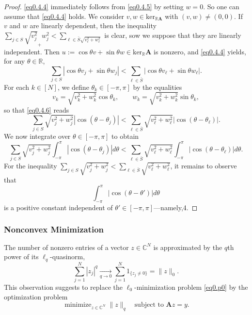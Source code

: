 \begin{proof}
    \cref{eq0.4.4} immediately follows from \cref{eq0.4.5} by setting $w = 0$. So one can assume that \cref{eq0.4.4} holds. We consider $v,w \in \text{ker}_{\mathbb{R}\mathbf{A}}$ with $(v,w) \neq (0,0)$. If $v$ and $w$ are linearly dependent, then the inequality $\sum_{j \in S} \sqrt{v_j^2} _+ w_j^2 < \sum_{\ell \in \bar{S} \sqrt{v_{\ell}^2 + w_{\ell}^2}}$ is clear, sow we suppose that they are linearly independent. Then $u := \cos\theta v + \sin \theta w \in \text{ker}_{\mathbb{R}}\mathbf{A}$ is nonzero, and \cref{eq0.4.4} yields, for any $\theta \in \mathbb{R}$, 
    \begin{equation}
        \sum\limits_{j \in S} \left|\cos \theta v_j + \sin \theta w_j\right| < \sum\limits_{\ell \in \bar{S}} \left|\cos \theta v_{\ell} + \sin \theta w_{\ell}\right|.
        \label{eq0.4.6}
    \end{equation}
    For each $k \in [N]$, we define $\theta_k \in [-\pi, \pi]$ by the equalities
    \[
        v_k = \sqrt{v_k^2 + w_k^2} \cos \theta_k, \qquad w_k = \sqrt{v_k^2 + w_k^2} \sin \theta_k,
    \]
    so that \cref{eq0.4.6} reads
    \[
        \sum\limits_{j \in S} \sqrt{v_j^2 + w_j^2}\left|\cos (\theta - \theta_j)\right| < \sum\limits_{\ell \in \bar{S}} \sqrt{v_{\ell}^2 + w_{\ell}^2} \left|\cos(\theta - \theta_{\ell})\right|.
    \]
    We now integrate over $\theta \in [-\pi, \pi]$ to obtain
    \[
        \sum\limits_{j \in S} \sqrt{v_j^2 + w_j^2} \int_{-\pi}^{\pi} \left|\cos(\theta - \theta_j)\right|d\theta < \sum\limits_{\ell \in \bar{S}} \sqrt{v_{\ell}^2 + w_{\ell}^2} \int_{-\pi}^{\pi}\left|\cos(\theta - \theta_{\ell})\right|d\theta.
    \]
    For the inequality $\sum_{j \in S} \sqrt{v_j^2+w_j^2} < \sum_{\ell \in \bar{S}} \sqrt{v_{\ell}^2+ w_{\ell}^2}$, it remains to observe that 
    \[
        \int_{-\pi}^{\pi}\left|\cos(\theta - \theta')\right|d\theta
    \]
    is a positive constant independent of $\theta'\in [-\pi, \pi]$---namely,4. 
\end{proof}

\subsubsection{Nonconvex Minimization}

The number of nonzero entries of a vector $z \in \mathbb{C}^N$ is approximated by the $q$th power of its $\ell_q$-quasinorm,
\[
    \sum\limits_{j = 1}^N \left|z_j\right|^q \xrightarrow[q \rightarrow 0]{} \sum\limits_{j=1}^N 1_{\{z_j \neq 0\}} = \|z\|_0. 
\]
This observation suggests to replace the $\ell_0$-minimization problem \cref{eq0.p0} by the optimization problem
\begin{equation}
    \mathop{\mathrm{minimize}}_{z \in \mathbb{C}^N} \|z\|_q \quad \text{subject to }\mathbf{A}z = y. \tag{P$_q$}
    \label{eqpq}
\end{equation}

